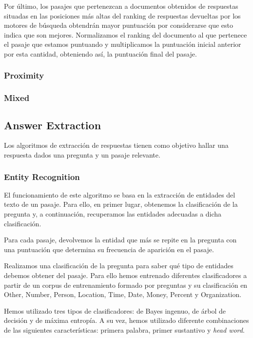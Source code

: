 \documentclass[12pt,a4paper,titlepage]{article}
\newcounter{subsubsubsection}
\begin{document}
Por último, los pasajes que pertenezcan a documentos obtenidos de respuestas situadas en las posiciones más altas del ranking de respuestas devueltas por los motores de búsqueda obtendrán mayor puntuación por considerarse que esto indica que son mejores. Normalizamos el ranking del documento al que pertenece el pasaje que estamos puntuando y multiplicamos la puntuación inicial anterior por esta cantidad, obteniendo así, la puntuación final del pasaje.

\subsubsection{Proximity}

\subsubsection{Mixed}

\subsection{Answer Extraction}
Los algoritmos de extracción de respuestas tienen como objetivo hallar una respuesta dados una pregunta y un pasaje relevante.

\subsubsection{Entity Recognition}
\label{s:ne_recog}
El funcionamiento de este algoritmo se basa en la extracción de entidades del texto de un pasaje. Para ello, en primer lugar, obtenemos la clasificación de la pregunta y, a continuación, recuperamos las entidades adecuadas a dicha clasificación.

Para cada pasaje, devolvemos la entidad que más se repite en la pregunta con una puntuación que determina su frecuencia de aparición en el pasaje.

Realizamos una clasificación de la pregunta para saber qué tipo de entidades debemos obtener del pasaje. Para ello hemos entrenado diferentes clasificadores a partir de un corpus de entrenamiento formado por preguntas y su clasificación en Other, Number, Person, Location, Time, Date, Money, Percent y Organization.

Hemos utilizado tres tipos de clasificadores: de Bayes ingenuo, de árbol de decisión y de máxima entropía. A su vez, hemos utilizado diferente combinaciones de las siguientes características: primera palabra, primer sustantivo y \emph{head word}.
\end{document}
